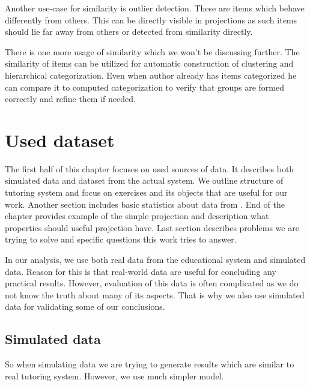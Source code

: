 \documentclass[
  digital, %
  table,   %
  nolof,     %
  nolot,     %
  nocover,
  color
]{fithesis3}
\begin{document}
Another use-case for similarity is outlier detection. These are items which behave differently from others. This can be directly visible in projections as such items should lie far away from others or detected from similarity directly.

There is one more usage of similarity which we won't be discussing further. The similarity of items can be utilized for automatic construction of clustering and hierarchical categorization. Even when author already has items categorized he can compare it to computed categorization to verify that groups are formed correctly and refine them if needed.


\chapter{Used dataset}\label{used-dataset}


The first half of this chapter focuses on used sources of data. It describes both simulated data and dataset from the actual system. We outline structure of tutoring system and focus on exercises and its objects that are useful for our work. Another section includes basic statistics about data from \umimeCesky{}. End of the chapter provides example of the simple projection and description what properties should useful projection have. Last section describes problems we are trying to solve and specific questions this work tries to answer.


In our analysis, we use both real data from the educational system and simulated data. Reason for this is that real-world data are useful for concluding any practical results. However, evaluation of this data is often complicated as we do not know the truth about many of its aspects. That is why we also use simulated data for validating some of our conclusions.


\section{Simulated data}\label{simulated-data}

So when simulating data we are trying to generate results which are similar to real tutoring system. However, we use much simpler model.
\end{document}
